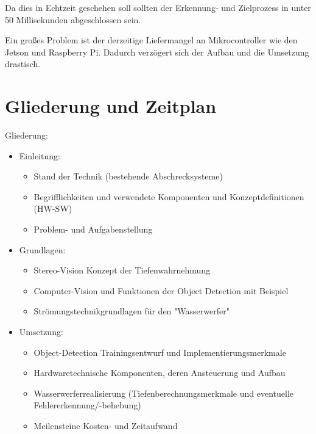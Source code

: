\documentclass{scrartcl}
\begin{document}
Da dies in Echtzeit geschehen soll sollten der Erkennung- und Zielprozess in unter 50 Millisekunden abgeschlossen sein.

Ein großes Problem ist der derzeitige Liefermangel an Mikrocontroller
wie den Jetson und Raspberry Pi. Dadurch verzögert sich der Aufbau und die Umsetzung drastisch.

\section{Gliederung und Zeitplan}

Gliederung:
\begin{itemize}
    \item Einleitung:
    \begin{itemize}
        \item Stand der Technik (bestehende Abschrecksysteme)
        \item Begrifflichkeiten und verwendete Komponenten und Konzeptdefinitionen (HW-SW)
        \item Problem- und Aufgabenstellung
    \end{itemize}
    \item Grundlagen:
    \begin{itemize}
        \item Stereo-Vision Konzept der Tiefenwahrnehmung
        \item Computer-Vision und Funktionen der Object Detection mit Beispiel
        \item Strömungstechnikgrundlagen für den "Wasserwerfer"
    \end{itemize}
    \item Umsetzung:
    \begin{itemize}
        \item Object-Detection Trainingsentwurf und Implementierungsmerkmale
        \item Hardwaretechnische Komponenten, deren Ansteuerung und Aufbau
        \item Wasserwerferrealisierung (Tiefenberechnungsmerkmale und eventuelle Fehlererkennung/-behebung)
        \item Meilensteine Kosten- und Zeitaufwand
    \end{itemize}
\end{itemize}
\end{document}
